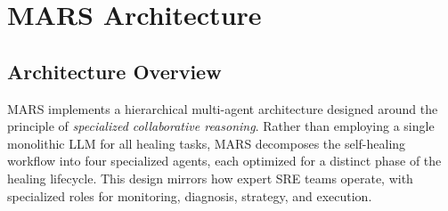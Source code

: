 \documentclass[journal]{IEEEtran}
\begin{document}
\section{MARS Architecture}
\label{sec:architecture}

\subsection{Architecture Overview}

MARS implements a hierarchical multi-agent architecture designed around the principle of \textit{specialized collaborative reasoning}. Rather than employing a single monolithic LLM for all healing tasks, MARS decomposes the self-healing workflow into four specialized agents, each optimized for a distinct phase of the healing lifecycle. This design mirrors how expert SRE teams operate, with specialized roles for monitoring, diagnosis, strategy, and execution.
\end{document}
